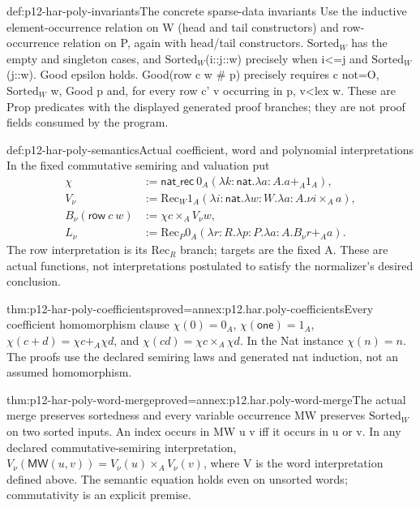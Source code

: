 \begin{hbdefinition}{def:p12-har-poly-invariants}{The concrete sparse-data invariants}
Use the inductive element-occurrence relation on W (head and tail
constructors) and row-occurrence relation on P, again with head/tail
constructors. \(\mathrm{Sorted}_W\) has the empty and singleton cases, and
\(\mathrm{Sorted}_W\)(i::j::w) precisely when i<=j and \(\mathrm{Sorted}_W\)(j::w).
Good epsilon holds. Good(row c w \# p) precisely requires c not=O,
\(\mathrm{Sorted}_W\) w, Good p and, for every row c' v occurring in p, v<lex w.
These are Prop predicates with the displayed generated proof branches;
they are not proof fields consumed by the program.
\end{hbdefinition}

\begin{hbdefinition}{def:p12-har-poly-semantics}{Actual coefficient, word and polynomial interpretations}
In the fixed commutative semiring and valuation put
\[
\begin{aligned}
 \chi&:=\mathsf{nat\_rec}\ 0_A
                (\lambda k:\mathsf{nat}.\lambda a:A.a+_A1_A),\\
 V_\nu&:=\mathrm{Rec}_W1_A
       (\lambda i:\mathsf{nat}.\lambda w:W.\lambda a:A.\nu i\times_A a),\\
 B_\nu(\mathsf{row}\ c\ w)&:=\chi c\times_A V_\nu w,\\
 L_\nu&:=\mathrm{Rec}_P0_A
       (\lambda r:R.\lambda p:P.\lambda a:A.B_\nu r+_A a).
\end{aligned}
\]
The row interpretation is its \(\mathrm{Rec}_R\) branch; targets are the fixed A.
These are actual functions, not interpretations postulated to satisfy
the normalizer's desired conclusion.
\end{hbdefinition}

\begin{hblemma}{thm:p12-har-poly-coefficients}{proved=annex:p12.har.poly-coefficients}{Every coefficient homomorphism clause}
\(\chi(0)=0_A\), \(\chi(\mathsf{one})=1_A\),
\(\chi(c+d)=\chi c+_A\chi d\), and
\(\chi(cd)=\chi c\times_A\chi d\).
In the Nat instance \(\chi(n)=n\). The proofs use the declared semiring
laws and generated nat induction, not an assumed homomorphism.
\end{hblemma}

\begin{hblemma}{thm:p12-har-poly-word-merge}{proved=annex:p12.har.poly-word-merge}{The actual merge preserves sortedness and every variable occurrence}
MW preserves \(\mathrm{Sorted}_W\) on two sorted inputs. An index occurs in MW u v
iff it occurs in u or v. In any declared commutative-semiring interpretation,
\(V_\nu(\mathsf{MW}(u,v))=V_\nu(u)\times_A V_\nu(v)\),
where V is the word interpretation defined above. The semantic equation
holds even on unsorted words; commutativity is an explicit premise.
\end{hblemma}


